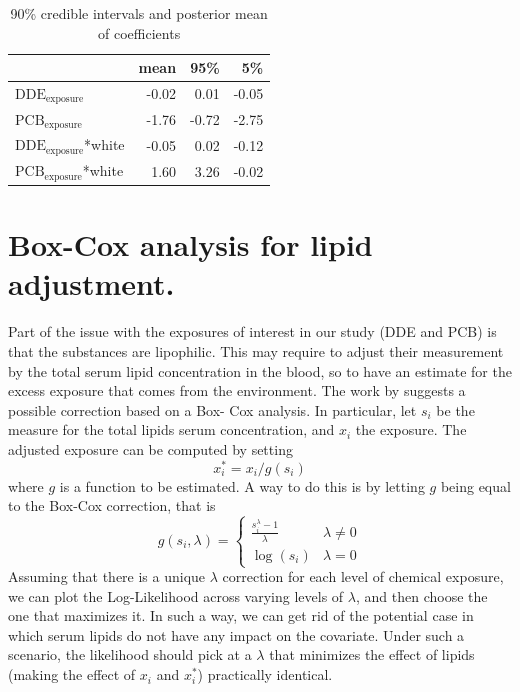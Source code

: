 \documentclass[10pt]{jmlr}%
\begin{document}
\begin{table}
	\centering
	\begin{tabular}{lrrr}
		\toprule
		& mean & 95\% & 5\%\\
		\midrule
		$\text{DDE}_{\text{exposure}}$ & -0.02 & 0.01 & -0.05\\
		$\text{PCB}_{\text{exposure}}$& -1.76 & -0.72 & -2.75\\
		$\text{DDE}_{\text{exposure}}$*white & -0.05 & 0.02 & -0.12\\
		$\text{PCB}_{\text{exposure}}$*white & 1.60 & 3.26 & -0.02\\
		\bottomrule
	\end{tabular}
	\caption{\label{tab:confints} 90\% credible intervals and posterior mean of coefficients}
\end{table}
\newpage  %

\section{Box-Cox analysis for lipid adjustment.}

Part of the issue with the exposures of interest in our study (DDE and PCB) is that the substances are lipophilic. This may require to adjust their measurement by the total serum lipid concentration in the blood, so to have an estimate for the excess exposure that comes from the environment. The work by \cite{Li_Long_Duns} suggests a possible correction based on a Box- Cox analysis. In particular, let $s_i$ be the measure for the total lipids serum concentration, and $x_i$ the exposure. The adjusted exposure can be computed by setting 
\begin{equation}
x_i^* = x_i/g(s_i)
\end{equation} 
where $g$ is a function to be estimated. A way to do this is by letting $g$ being equal to the Box-Cox correction, that is
\begin{equation}
g(s_i,\lambda) = 
\begin{cases} 
\frac{s_i^\lambda-1}{\lambda} & \lambda \neq 0 \\
\log(s_i) & \lambda =0 
\end{cases}
\end{equation}
Assuming that there is a unique $\lambda$ correction for each level of chemical exposure, we can plot the Log-Likelihood across varying levels of $\lambda$, and then choose the one that maximizes it. In such a way, we can get rid of the potential case in which serum lipids do not have any impact on the covariate. Under such a scenario, the likelihood should pick at a $\lambda$ that minimizes the effect of lipids (making the effect of $x_i$ and $x_i^*$) practically identical. 
\end{document}
